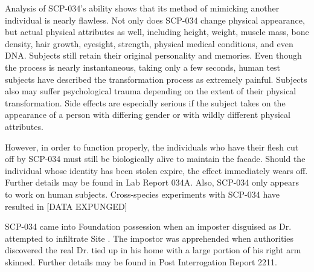 Analysis of SCP-034's ability shows that its method of mimicking another individual is nearly flawless. Not only does SCP-034 change physical appearance, but actual physical attributes as well, including height, weight, muscle mass, bone density, hair growth, eyesight, strength, physical medical conditions, and even DNA. Subjects still retain their original personality and memories. Even though the process is nearly instantaneous, taking only a few seconds, human test subjects have described the transformation process as extremely painful. Subjects also may suffer psychological trauma depending on the extent of their physical transformation. Side effects are especially serious if the subject takes on the appearance of a person with differing gender or with wildly different physical attributes.

However, in order to function properly, the individuals who have their flesh cut off by SCP-034 must still be biologically alive to maintain the facade. Should the individual whose identity has been stolen expire, the effect immediately wears off. Further details may be found in Lab Report 034A. Also, SCP-034 only appears to work on human subjects. Cross-species experiments with SCP-034 have resulted in [DATA EXPUNGED]

SCP-034 came into Foundation possession when an imposter disguised as Dr.  attempted to infiltrate Site . The impostor was apprehended when authorities discovered the real Dr.  tied up in his home with a large portion of his right arm skinned. Further details may be found in Post Interrogation Report 2211.

